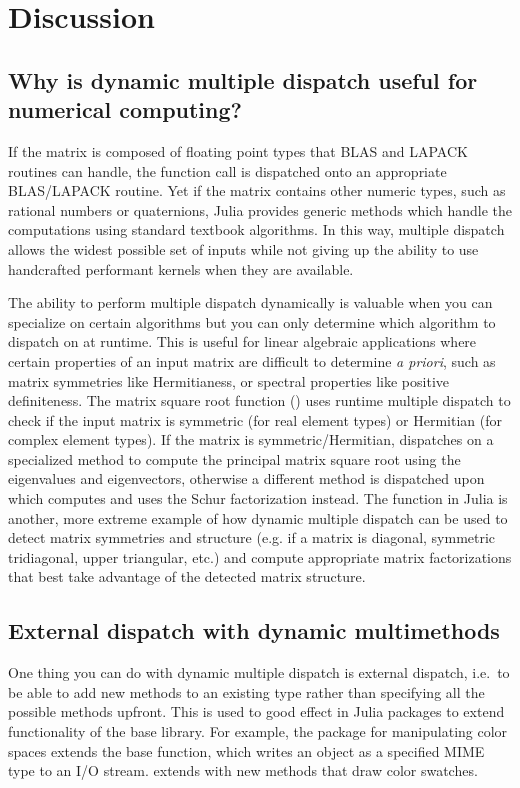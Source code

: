 \section{Discussion}

\subsection{Why is dynamic multiple dispatch useful for numerical computing?}

If the matrix is composed of floating point types that BLAS and
LAPACK routines can handle, the function call is dispatched onto an
appropriate BLAS/LAPACK routine. Yet if the matrix contains other
numeric types, such as rational numbers or quaternions, Julia provides
generic methods which handle the computations using standard textbook
algorithms. In this way, multiple dispatch allows the widest possible
set of inputs while not giving up the ability to use handcrafted
performant kernels when they are available.

The ability to perform multiple dispatch dynamically is valuable
when you can specialize on certain algorithms but you can only
determine which algorithm to dispatch on at runtime. This is useful
for linear algebraic applications where certain properties of an input
matrix are difficult to determine \textit{a priori}, such as matrix
symmetries like Hermitianess, or spectral properties like positive
definiteness. The matrix square root function () uses
runtime multiple dispatch to check if the input matrix is symmetric
(for real element types) or Hermitian (for complex element types). If
the matrix is symmetric/Hermitian,  dispatches on a
specialized method to compute the principal matrix square root using
the eigenvalues and eigenvectors, otherwise a different method is
dispatched upon which computes and uses the Schur factorization
instead. The  function in Julia is another, more
extreme example of how dynamic multiple dispatch can be used to detect
matrix symmetries and structure (e.g. if a matrix is diagonal,
symmetric tridiagonal, upper triangular, etc.) and compute appropriate
matrix factorizations that best take advantage of the detected matrix
structure.

\subsection{External dispatch with dynamic multimethods}

One thing you can do with dynamic multiple dispatch is external dispatch,
i.e.\ to be able to add new methods to an existing type rather than
specifying all the possible methods upfront. This is used to good effect
in Julia packages to extend functionality of the base library. For example,
the package  for manipulating color spaces extends the
 base function, which writes an object as a specified
MIME type\cite{mimerfc} to an I/O stream.  extends
 with new methods that draw color swatches.

